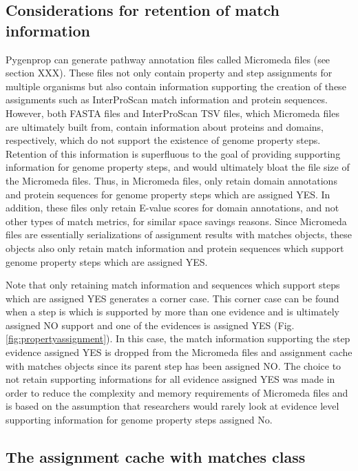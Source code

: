 \subsection{Considerations for retention of match information}

Pygenprop can generate pathway annotation files called Micromeda files (see section XXX). These files not only contain property and step assignments for multiple organisms but also contain information supporting the creation of these assignments such as InterProScan match information and protein sequences. However, both FASTA files and InterProScan TSV files, which Micromeda files are ultimately built from, contain information about proteins and domains, respectively, which do not support the existence of genome property steps. Retention of this information is superfluous to the goal of providing supporting information for genome property steps, and would ultimately bloat the file size of the Micromeda files. Thus, in Micromeda files,  only retain domain annotations and protein sequences for genome property steps which are assigned YES. In addition, these files only retain E-value scores for domain annotations, and not other types of match metrics, for similar space savings reasons. Since Micromeda files are essentially serializations of assignment results with matches objects, these objects also only retain match information and protein sequences which support genome property steps which are assigned YES. 

Note that only retaining match information and sequences which support steps which are assigned YES generates a corner case. This corner case can be found when a step is which is supported by more than one evidence and is ultimately assigned NO support and one of the evidences is assigned YES (Fig. \ref{fig:propertyassignment}). In this case, the match information supporting the step evidence assigned YES is dropped from the Micromeda files and assignment cache with matches objects since its parent step has been assigned NO. The choice to not retain supporting informations for all evidence assigned YES was made in order to reduce the complexity and memory requirements of Micromeda files and is based on the assumption that researchers would rarely look at evidence level supporting information for genome property steps assigned No.

\subsection{The assignment cache with matches class}

